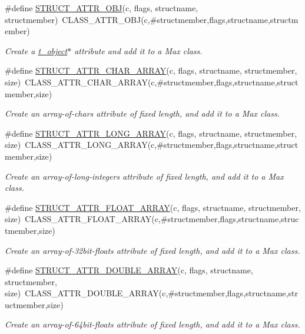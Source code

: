 \begin{DoxyCompactItemize}
\#define \hyperlink{group__attr_ga7b440c21c972a30de940b2c29ef692d3}{STRUCT\_\-ATTR\_\-OBJ}(c, flags, structname, structmember)~CLASS\_\-ATTR\_\-OBJ(c,\#structmember,flags,structname,structmember)
\begin{DoxyCompactList}\small\item\em Create a \hyperlink{structt__object}{t\_\-object}$\ast$ attribute and add it to a Max class. \item\end{DoxyCompactList}\item 
\#define \hyperlink{group__attr_ga802ed4199e77e397d1fd6fba07787b71}{STRUCT\_\-ATTR\_\-CHAR\_\-ARRAY}(c, flags, structname, structmember, size)~CLASS\_\-ATTR\_\-CHAR\_\-ARRAY(c,\#structmember,flags,structname,structmember,size)
\begin{DoxyCompactList}\small\item\em Create an array-\/of-\/chars attribute of fixed length, and add it to a Max class. \item\end{DoxyCompactList}\item 
\#define \hyperlink{group__attr_ga9ce1cdfb365ad9de15840fdaa5b4b1cd}{STRUCT\_\-ATTR\_\-LONG\_\-ARRAY}(c, flags, structname, structmember, size)~CLASS\_\-ATTR\_\-LONG\_\-ARRAY(c,\#structmember,flags,structname,structmember,size)
\begin{DoxyCompactList}\small\item\em Create an array-\/of-\/long-\/integers attribute of fixed length, and add it to a Max class. \item\end{DoxyCompactList}\item 
\#define \hyperlink{group__attr_ga5b7d0da905adfd22f42b4a41721286a0}{STRUCT\_\-ATTR\_\-FLOAT\_\-ARRAY}(c, flags, structname, structmember, size)~CLASS\_\-ATTR\_\-FLOAT\_\-ARRAY(c,\#structmember,flags,structname,structmember,size)
\begin{DoxyCompactList}\small\item\em Create an array-\/of-\/32bit-\/floats attribute of fixed length, and add it to a Max class. \item\end{DoxyCompactList}\item 
\#define \hyperlink{group__attr_ga4bef3fbaa0403c2f9eefa942ffc8b00f}{STRUCT\_\-ATTR\_\-DOUBLE\_\-ARRAY}(c, flags, structname, structmember, size)~CLASS\_\-ATTR\_\-DOUBLE\_\-ARRAY(c,\#structmember,flags,structname,structmember,size)
\begin{DoxyCompactList}\small\item\em Create an array-\/of-\/64bit-\/floats attribute of fixed length, and add it to a Max class. \item\end{DoxyCompactList}\item 

\end{DoxyCompactItemize}
